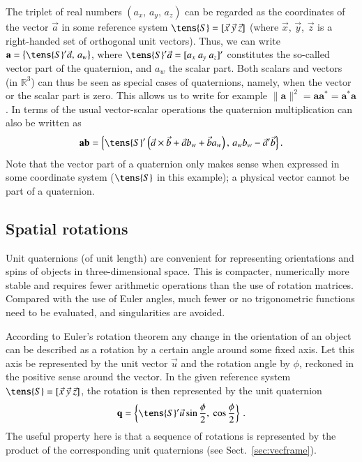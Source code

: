 \documentclass[structabstract]{aa}
\newcommand{\quat}[1]{\mathbf{#1}}
\begin{document}
The triplet of real numbers $(a_x,\,a_y,\,a_z)$ can be regarded 
as the coordinates of the vector $\vec{a}$ in some reference system 
$\tens{S}=[\vec{x}~\vec{y}~\vec{z}]$ (where $\vec{x}$, $\vec{y}$, 
$\vec{z}$ is a right-handed set of orthogonal unit vectors). 
Thus, we can write $\quat{a}=\bigl\{\tens{S}'\vec{a},\,a_w\bigr\}$, 
where $\tens{S}'\vec{a}=[a_x~a_y~a_z]'$ constitutes the so-called 
vector part of the quaternion, and $a_w$ the scalar part. Both scalars 
and vectors (in $\mathbb{R}^3$) can thus be seen as special
cases of quaternions, namely, when the vector or the scalar
part is zero. This allows us to write for example
$\lVert\quat{a}\rVert^2=\quat{a}\quat{a}^*=\quat{a}^*\quat{a}$.
In terms of the usual vector-scalar operations the quaternion
multiplication can also be written as
\begin{equation}\label{eq:quatmultvec}
\quat{a}\quat{b}=\Bigl\{\tens{S}'\left(\vec{a}\times\vec{b}+
\vec{a}b_w+\vec{b}a_w\right),\, a_wb_w-\vec{a}'\vec{b}\Bigr\} \, .
\end{equation}
Note that the vector part of a quaternion only makes sense when
expressed in some coordinate system ($\tens{S}$ in this example);
a physical vector cannot be part of a quaternion.


\subsection{Spatial rotations}\label{sec:quatrot}

Unit quaternions (of unit length)
are convenient for representing orientations and spins of
objects in three-dimensional space. This is compacter, numerically
more stable and requires fewer arithmetic operations than the use
of rotation matrices. Compared with the use of Euler angles,
much fewer or no trigonometric functions need to be evaluated,
and singularities are avoided.

According to Euler's rotation theorem any change in the orientation
of an object can be described as a rotation by a certain angle
around some fixed axis. Let this axis be represented by the unit
vector $\vec{u}$ and the rotation angle by $\phi$, reckoned
in the positive sense around the vector. In the given reference 
system $\tens{S}=[\vec{x}~\vec{y}~\vec{z}]$, the rotation is then
represented by the unit quaternion
\begin{equation}\label{eq:quatrot}
\quat{q}=\left\{\tens{S}'\vec{u}\sin\frac{\phi}{2},~\cos\frac{\phi}{2}
\right\} \, .
\end{equation}
The useful property here is that a sequence of rotations is 
represented by the product of the corresponding unit 
quaternions (see Sect.~\ref{sec:vecframe}).
\end{document}
